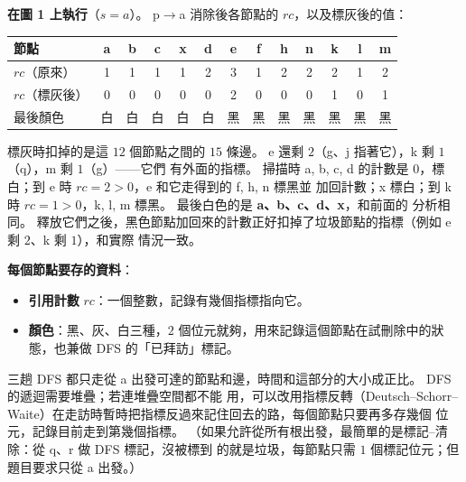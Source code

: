 \begin{pastsoln}
\textbf{在圖 1 上執行}（$s = a$）。 p$\to$a 消除後各節點的 $\mathit{rc}$，以及標灰後的值：
\begin{center}
\small
\setlength{\tabcolsep}{4.5pt}
\begin{tabular}{l*{12}{c}}
\toprule
節點 & a & b & c & x & d & e & f & h & n & k & l & m \\
\midrule
$\mathit{rc}$（原來） & 1 & 1 & 1 & 1 & 2 & 3 & 1 & 2 & 2 & 2 & 1 & 2 \\
$\mathit{rc}$（標灰後） & 0 & 0 & 0 & 0 & 0 & 2 & 0 & 0 & 0 & 1 & 0 & 1 \\
最後顏色 & 白 & 白 & 白 & 白 & 白 & 黑 & 黑 & 黑 & 黑 & 黑 & 黑 & 黑 \\
\bottomrule
\end{tabular}
\end{center}
標灰時扣掉的是這 $12$ 個節點之間的 $15$ 條邊。 e 還剩 $2$（g、j 指著它），k 剩 $1$（q），m 剩 $1$（g）——它們
有外面的指標。 掃描時 a, b, c, d 的計數是 $0$，標白；到 e 時 $\mathit{rc} = 2 > 0$，e 和它走得到的 f, h, n 標黑並
加回計數；x 標白；到 k 時 $\mathit{rc} = 1 > 0$，k, l, m 標黑。 最後白色的是 \textbf{a、b、c、d、x}，和前面的
分析相同。 釋放它們之後，黑色節點加回來的計數正好扣掉了垃圾節點的指標（例如 e 剩 $2$、k 剩 $1$），和實際
情況一致。

\textbf{每個節點要存的資料}：
\begin{itemize}
\item \textbf{引用計數} $\mathit{rc}$：一個整數，記錄有幾個指標指向它。
\item \textbf{顏色}：黑、灰、白三種，$2$ 個位元就夠，用來記錄這個節點在試刪除中的狀態，也兼做 DFS 的「已拜訪」標記。
\end{itemize}
三趟 DFS 都只走從 a 出發可達的節點和邊，時間和這部分的大小成正比。 DFS 的遞迴需要堆疊；若連堆疊空間都不能
用，可以改用指標反轉（Deutsch--Schorr--Waite）在走訪時暫時把指標反過來記住回去的路，每個節點只要再多存幾個
位元，記錄目前走到第幾個指標。 （如果允許從所有根出發，最簡單的是標記--清除：從 q、r 做 DFS 標記，沒被標到
的就是垃圾，每節點只需 $1$ 個標記位元；但題目要求只從 a 出發。）
\end{pastsoln}
